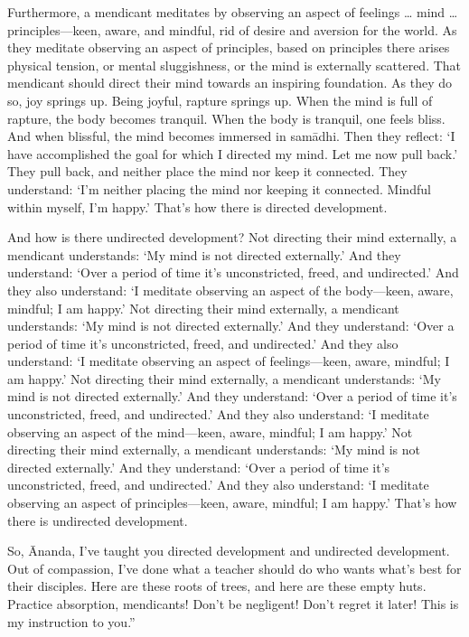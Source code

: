 \documentclass[12pt,openany]{book}%
\begin{document}
Furthermore, a mendicant meditates by observing an aspect of feelings … mind … principles—keen, aware, and mindful, rid of desire and aversion for the world. As they meditate observing an aspect of principles, based on principles there arises physical tension, or mental sluggishness, or the mind is externally scattered. That mendicant should direct their mind towards an inspiring foundation. As they do so, joy springs up. Being joyful, rapture springs up. When the mind is full of rapture, the body becomes tranquil. When the body is tranquil, one feels bliss. And when blissful, the mind becomes immersed in \textsanskrit{samādhi}. Then they reflect: ‘I have accomplished the goal for which I directed my mind. Let me now pull back.’ They pull back, and neither place the mind nor keep it connected. They understand: ‘I’m neither placing the mind nor keeping it connected. Mindful within myself, I’m happy.’ That’s how there is directed development. 

And how is there undirected development? Not directing their mind externally, a mendicant understands: ‘My mind is not directed externally.’ And they understand: ‘Over a period of time it’s unconstricted, freed, and undirected.’ And they also understand: ‘I meditate observing an aspect of the body—keen, aware, mindful; I am happy.’ Not directing their mind externally, a mendicant understands: ‘My mind is not directed externally.’ And they understand: ‘Over a period of time it’s unconstricted, freed, and undirected.’ And they also understand: ‘I meditate observing an aspect of feelings—keen, aware, mindful; I am happy.’ Not directing their mind externally, a mendicant understands: ‘My mind is not directed externally.’ And they understand: ‘Over a period of time it’s unconstricted, freed, and undirected.’ And they also understand: ‘I meditate observing an aspect of the mind—keen, aware, mindful; I am happy.’ Not directing their mind externally, a mendicant understands: ‘My mind is not directed externally.’ And they understand: ‘Over a period of time it’s unconstricted, freed, and undirected.’ And they also understand: ‘I meditate observing an aspect of principles—keen, aware, mindful; I am happy.’ That’s how there is undirected development. 

So, Ānanda, I’ve taught you directed development and undirected development. Out of compassion, I’ve done what a teacher should do who wants what’s best for their disciples. Here are these roots of trees, and here are these empty huts. Practice absorption, mendicants! Don’t be negligent! Don’t regret it later! This is my instruction to you.” 
\end{document}
